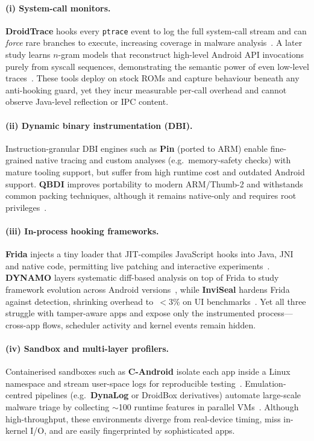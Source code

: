 \documentclass[a4paper,12pt]{report}
\begin{document}
\paragraph{(i) System-call monitors.}
\textbf{DroidTrace} hooks every \texttt{ptrace} event to log the full
system-call stream and can \emph{force} rare branches to execute, increasing
coverage in malware analysis~\cite{zheng2014droidtrace}.  A later study
learns $n$-gram models that reconstruct high-level Android API invocations
purely from syscall sequences, demonstrating the semantic power of even
low-level traces~\cite{nisi2019syscall}.  These tools deploy on stock ROMs and
capture behaviour beneath any anti-hooking guard, yet they incur measurable
per-call overhead and cannot observe Java-level reflection or IPC content.

\paragraph{(ii) Dynamic binary instrumentation (DBI).}
Instruction-granular DBI engines such as \textbf{Pin} (ported to
ARM) enable fine-grained native tracing and custom analyses
(e.g.\ memory-safety checks) with mature tooling support, but
suffer from high runtime cost and outdated Android
support.  \textbf{QBDI} improves portability to modern ARM/Thumb-2
and withstands common packing techniques, although it remains native-only and
requires root privileges~\cite{qbdiblackhat2020}.

\paragraph{(iii) In-process hooking frameworks.}
\textbf{Frida} injects a tiny loader that JIT-compiles JavaScript hooks into
Java, JNI and native code, permitting live patching and interactive
experiments~\cite{frida2020}.  \textbf{DYNAMO} layers systematic diff-based
analysis on top of Frida to study framework evolution across Android
versions~\cite{dynamo2021}, while \textbf{InviSeal} hardens Frida against
detection, shrinking overhead to~$<\!3\%$ on UI benchmarks~\cite{inviseal2023}.
Yet all three struggle with tamper-aware apps and expose only the instrumented
process—cross-app flows, scheduler activity and kernel events remain hidden.

\paragraph{(iv) Sandbox and multi-layer profilers.}
Containerised sandboxes such as \textbf{C-Android} isolate each app inside a
Linux namespace and stream user-space logs for reproducible
testing~\cite{candroid2019}.  Emulation-centred pipelines (e.g.\ \textbf{DynaLog}
or DroidBox derivatives) automate large-scale malware triage by collecting
$\sim$100 runtime features in parallel VMs~\cite{dynalog2016}.  Although
high-throughput, these environments diverge from real-device timing,
miss in-kernel I/O, and are easily fingerprinted by sophisticated apps.
\end{document}
